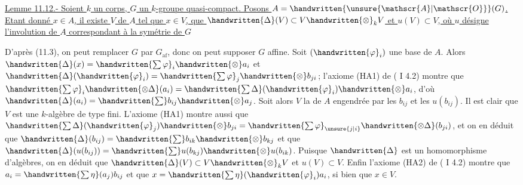 
\uline{Lemme 11.12.- Soient $k$ un corps, $G$ un $k$-groupe quasi-compact. Posons $A=\handwritten{\unsure{\mathscr{A}|\mathscr{O}}}(G)$. Etant donné $x\in A$, il existe  $V$ de $A$ tel que $x\in V$, que $\handwritten{\Delta}(V)\subset V\handwritten{\otimes}_k V$ et $u(V)\subset V$, où $u$ désigne l'involution de $A$ correspondant à la symétrie de $G$}

D'après (11.3), on peut remplacer $G$ par $G_{\mathrm{af}}$, donc on peut supposer $G$ affine. Soit $(\handwritten{\varphi}_i)$ une base de $A$. Alors $\handwritten{\Delta}(x)=\handwritten{\sum\varphi}_i\handwritten{\otimes}a_i$ et $\handwritten{\Delta}(\handwritten{\varphi}_i)=\handwritten{\sum\varphi}_j\handwritten{\otimes}b_{ji}$; l'axiome (HA1) de ( I 4.2) montre que $\handwritten{\sum\varphi}_i\handwritten{\otimes\Delta}(a_i)=\handwritten{\sum\Delta}(\handwritten{\varphi}_i)\handwritten{\otimes}a_i$, d'où $\handwritten{\Delta}(a_i)=\handwritten{\sum}b_{ij}\handwritten{\otimes}a_j$. Soit alors $V$ la  de $A$ engendrée par les $b_{ij}$ et les $u(b_{ij})$. Il est clair que $V$ est une $k$-algèbre de type fini. L'axiome (HA1) montre aussi que $\handwritten{\sum\Delta}(\handwritten{\varphi}_j)\handwritten{\otimes}b_{ji}=\handwritten{\sum\varphi}_{\unsure{j|i}}\handwritten{\otimes\Delta}(b_{ji})$, et on en déduit que $\handwritten{\Delta}(b_{ij})=\handwritten{\sum}b_{ik}\handwritten{\otimes}b_{kj}$ et que $\handwritten{\Delta}(u(b_{ij}))=\handwritten{\sum}u(b_{kj})\handwritten{\otimes}u(b_{ik})$. Puisque $\handwritten{\Delta}$ est un homomorphisme d'algèbres, on en déduit que $\handwritten{\Delta}(V)\subset V\handwritten{\otimes}_k V$ et $u(V)\subset V$. Enfin l'axiome (HA2) de ( I 4.2) montre que $a_i=\handwritten{\sum\eta}(a_j)b_{ij}$ et que $x=\handwritten{\sum\eta}(\handwritten{\varphi}_i)a_i$, si bien que $x\in V$.


